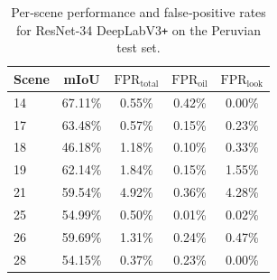 \documentclass[12pt]{article}
\begin{document}
\begin{table}[htbp]
\centering
\caption{Per‐scene performance and false‐positive rates for ResNet-34 DeepLabV3\texttt{+} on the Peruvian test set.}
\label{tab:resnet34_deeplabv3_fpr}
\small
\begin{tabular}{lcccc}
\toprule
\textbf{Scene} & \textbf{mIoU} & \(\mathrm{FPR}_{\mathrm{total}}\) & \(\mathrm{FPR}_{\mathrm{oil}}\) & \(\mathrm{FPR}_{\mathrm{look}}\) \\
\midrule
14 & 67.11\% & 0.55\% & 0.42\% & 0.00\% \\
17 & 63.48\% & 0.57\% & 0.15\% & 0.23\% \\
18 & 46.18\% & 1.18\% & 0.10\% & 0.33\% \\
19 & 62.14\% & 1.84\% & 0.15\% & 1.55\% \\
21 & 59.54\% & 4.92\% & 0.36\% & 4.28\% \\
25 & 54.99\% & 0.50\% & 0.01\% & 0.02\% \\
26 & 59.69\% & 1.31\% & 0.24\% & 0.47\% \\
28 & 54.15\% & 0.37\% & 0.23\% & 0.00\% \\
\bottomrule
\end{tabular}
\end{table}

\begin{table}[htbp]
\centering
\caption{Baseline fine-tuned segmentation performance on the Peruvian dataset using the standard Weighted Cross-Entropy + Dice loss. 
All models were trained without multi-scale augmentation or hard-negative sampling.}
\label{tab:baseline_wce_dice}
\end{table}
\end{document}
